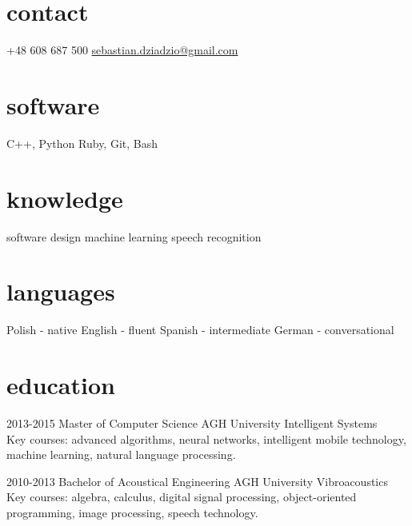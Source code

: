 \documentclass[]{friggeri-cv} %
\begin{document}


\begin{aside} %
\section{contact}
+48 608 687 500
\href{mailto:sebastian.dziadzio@gmail.com}{sebastian.dziadzio@gmail.com}
\href{http://pl.linkedin.com/in/sebastiandziadzio}{\color{gray} \faLinkedinSign} \href{https://github.com/sebastiandziadzio}{\color{gray} \faGithubSign} \href{https://twitter.com/sebadzia}{\color{gray} \faTwitterSign}
\section{software}
C++, Python
Ruby, Git, Bash
\section{knowledge}
software design
machine learning
speech recognition
\section{languages}
Polish - native
English - fluent
Spanish - intermediate
German - conversational
\end{aside}


\section{education}

\begin{entrylist}

\entry
{2013-2015}
{Master of Computer Science}
{AGH University}
{Intelligent Systems \\ Key courses: advanced algorithms, neural networks, intelligent mobile technology, machine learning, natural language processing.\\}

\entry
{2010-2013}
{Bachelor of Acoustical Engineering}
{AGH University}
{Vibroacoustics \\ Key courses: algebra, calculus, digital signal processing, object-oriented programming, image processing, speech technology.}
\end{entrylist}
\end{document}
